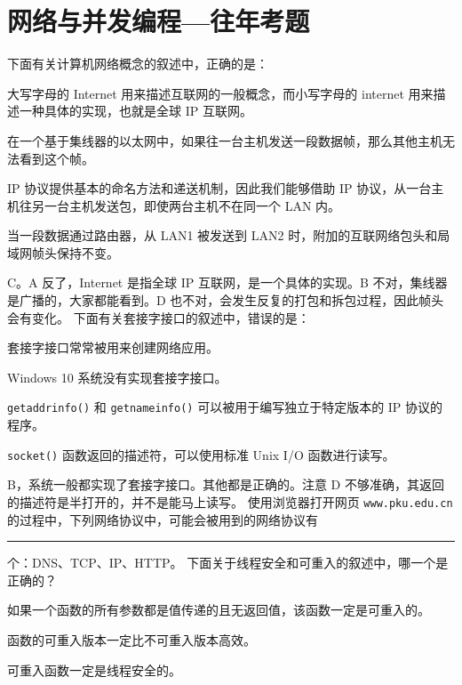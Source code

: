 \chapter{网络与并发编程{---}往年考题}\thispagestyle{empty}
    \begin{problems}
         下面有关计算机网络概念的叙述中，正确的是：
        \begin{choices}
            \item 大写字母的 Internet 用来描述互联网的一般概念，而小写字母的 internet 用来描述一种具体的实现，也就是全球 IP 互联网。
            \item 在一个基于集线器的以太网中，如果往一台主机发送一段数据帧，那么其他主机无法看到这个帧。
            \item IP 协议提供基本的命名方法和递送机制，因此我们能够借助 IP 协议，从一台主机往另一台主机发送包，即使两台主机不在同一个 LAN 内。
            \item 当一段数据通过路由器，从 LAN1 被发送到 LAN2 时，附加的互联网络包头和局域网帧头保持不变。
        \end{choices}
        \sol C。A 反了，Internet 是指全球 IP 互联网，是一个具体的实现。B 不对，集线器是广播的，大家都能看到。D 也不对，会发生反复的打包和拆包过程，因此帧头会有变化。
         下面有关套接字接口的叙述中，错误的是：
        \begin{choices}
            \item 套接字接口常常被用来创建网络应用。
            \item Windows 10 系统没有实现套接字接口。
            \item \verb|getaddrinfo()| 和 \verb|getnameinfo()| 可以被用于编写独立于特定版本的 IP 协议的程序。
            \item \verb|socket()| 函数返回的描述符，可以使用标准 Unix I/O 函数进行读写。
        \end{choices}
        \sol B，系统一般都实现了套接字接口。其他都是正确的。注意 D 不够准确，其返回的描述符是半打开的，并不是能马上读写。
         使用浏览器打开网页 \verb|www.pku.edu.cn| 的过程中，下列网络协议中，可能会被用到的网络协议有 \rule{2.5cm}{0.25mm} 个：DNS、TCP、IP、HTTP。
         下面关于线程安全和可重入的叙述中，哪一个是正确的？
        \begin{choices}
            \item 如果一个函数的所有参数都是值传递的且无返回值，该函数一定是可重入的。
            \item 函数的可重入版本一定比不可重入版本高效。
            \item 可重入函数一定是线程安全的。

\end{choices}
\end{problems}
